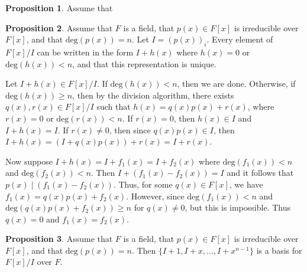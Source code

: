 \documentclass{article}
\makeatletter
\theoremstyle{definition}
\newtheorem{prop}{Proposition}[section]
\theoremstyle{remark}
\let\oldproofname=\proofname
\renewcommand{\proofname}{\textit{\oldproofname}}
\theoremstyle{definition}
\renewenvironment{proof}[1][\proofname]{\par
  \pushQED{\qed}%
  \normalfont \topsep6\p@\@plus6\p@\relax
  \list{}{\leftmargin=0mm
          \rightmargin=0mm
          \settowidth{\itemindent}{\itshape#1}%
          \labelwidth=\itemindent
          \parsep=0pt \listparindent=0mm%
  }
  \item[\hskip\labelsep
        \itshape
    #1\@addpunct{.}]\ignorespaces
}{%
  \popQED\endlist\@endpefalse
}
\makeatother
\begin{document}
    \begin{prop}\label{prop:1.3}
        Assume that 
    \end{prop}
        \begin{proof}
            
        \end{proof}
    \begin{prop}\label{prop:1.4}
        Assume that $F$ is a field, that $p(x)\in F[x]$ is irreducible over $F[x]$, and that $\text{deg}(p(x))=n$. Let $I=(p(x))_i$. Every element of $F[x]/I$ can be written in the form $I+h(x)$ where $h(x)=0$ or $\text{deg}(h(x))<n$, and that this representation is unique.
    \end{prop}
        \begin{proof}
            Let $I+h(x)\in F[x]/I$. If $\text{deg}(h(x))< n$, then we are done. Otherwise, if $\text{deg}(h(x))\geq n$, then by the division algorithm, there exists $q(x),r(x)\in F[x]/I$ such that $h(x)=q(x)p(x)+r(x)$, where $r(x)=0$ or $\text{deg}(r(x))<n$. If $r(x)=0$, then $h(x)\in I$ and $I+h(x)=I$. If $r(x)\neq 0$, then since $q(x)p(x)\in I$, then $I+h(x)=(I+q(x)p(x))+r(x)=I+r(x)$.\par\hspace{4mm} Now suppose $I+h(x)=I+f_1(x)=I+f_2(x)$ where $\text{deg}(f_1(x))<n$ and $\text{deg}(f_2(x))<n$. Then $I+(f_1(x)-f_2(x))=I$ and it follows that $p(x)\mid(f_1(x)-f_2(x))$. Thus, for some $q(x)\in F[x]$, we have $f_1(x)=q(x)p(x)+f_2(x)$. However, since $\text{deg}(f_1(x))<n$ and $\text{deg}(q(x)p(x)+f_2(x))\geq n$ for $q(x)\neq 0$, but this is impossible. Thus $q(x)=0$ and $f_1(x)=f_2(x)$. 
        \end{proof}\newpage
    \begin{prop}\label{prop:1.5}
        Assume that $F$ is a field, that $p(x)\in F[x]$ is irreducible over $F[x]$, and that $\text{deg}(p(x))=n$. Then $\{I+1,I+x,\dots,I+x^{n-1}\}$ is a basis for $F[x]/I$ over $F$.
    \end{prop}
\end{document}
